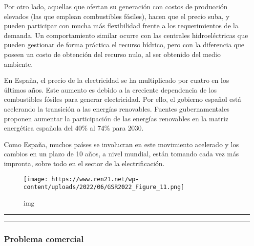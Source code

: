 \documentclass[11pt]{article}
\begin{document}
Por otro lado, aquellas que ofertan su generación con costos de
producción elevados (las que emplean combustibles fósiles), hacen que el
precio suba, y pueden participar con mucha más flexibilidad frente a los
requerimientos de la demanda. Un comportamiento similar ocurre con las
centrales hidroeléctricas que pueden gestionar de forma práctica el
recurso hídrico, pero con la diferencia que poseen un costo de obtención
del recurso nulo, al ser obtenido del medio ambiente.

En España, el precio de la electricidad se ha multiplicado por cuatro en
los últimos años. Este aumento es debido a la creciente dependencia de
los combustibles fósiles para generar electricidad. Por ello, el
gobierno español está acelerando la transición a las energías
renovables. Fuentes gubernamentales proponen aumentar la participación
de las energías renovables en la matriz energética española del 40\% al
74\% para 2030.

Como España, muchos países se involucran en este movimiento acelerado y
los cambios en un plazo de 10 años, a nivel mundial, están tomando cada
vez más impronta, sobre todo en el sector de la electrificación.

\begin{figure}
\centering
\texttt{[image: https://www.ren21.net/wp-content/uploads/2022/06/GSR2022\_Figure\_11.png]}
\caption{img}
\end{figure}

\begin{center}\rule{0.5\linewidth}{0.5pt}\end{center}

    \begin{center}\rule{0.5\linewidth}{0.5pt}\end{center}

\hypertarget{problema-comercial}{%
\subsubsection{Problema comercial}\label{problema-comercial}}
\end{document}

